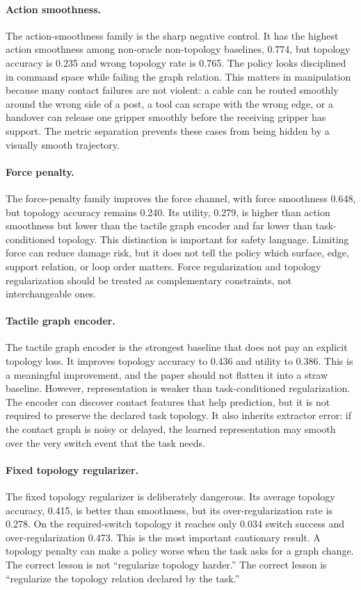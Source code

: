 \documentclass{article}
\begin{document}
\paragraph{Action smoothness.}
The action-smoothness family is the sharp negative control. It has the highest action smoothness among non-oracle non-topology baselines, 0.774, but topology accuracy is 0.235 and wrong topology rate is 0.765. The policy looks disciplined in command space while failing the graph relation. This matters in manipulation because many contact failures are not violent: a cable can be routed smoothly around the wrong side of a post, a tool can scrape with the wrong edge, or a handover can release one gripper smoothly before the receiving gripper has support. The metric separation prevents these cases from being hidden by a visually smooth trajectory.

\paragraph{Force penalty.}
The force-penalty family improves the force channel, with force smoothness 0.648, but topology accuracy remains 0.240. Its utility, 0.279, is higher than action smoothness but lower than the tactile graph encoder and far lower than task-conditioned topology. This distinction is important for safety language. Limiting force can reduce damage risk, but it does not tell the policy which surface, edge, support relation, or loop order matters. Force regularization and topology regularization should be treated as complementary constraints, not interchangeable ones.

\paragraph{Tactile graph encoder.}
The tactile graph encoder is the strongest baseline that does not pay an explicit topology loss. It improves topology accuracy to 0.436 and utility to 0.386. This is a meaningful improvement, and the paper should not flatten it into a straw baseline. However, representation is weaker than task-conditioned regularization. The encoder can discover contact features that help prediction, but it is not required to preserve the declared task topology. It also inherits extractor error: if the contact graph is noisy or delayed, the learned representation may smooth over the very switch event that the task needs.

\paragraph{Fixed topology regularizer.}
The fixed topology regularizer is deliberately dangerous. Its average topology accuracy, 0.415, is better than smoothness, but its over-regularization rate is 0.278. On the required-switch topology it reaches only 0.034 switch success and over-regularization 0.473. This is the most important cautionary result. A topology penalty can make a policy worse when the task asks for a graph change. The correct lesson is not ``regularize topology harder.'' The correct lesson is ``regularize the topology relation declared by the task.''
\end{document}
